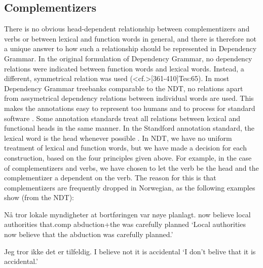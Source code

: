 \documentclass[11pt,a4paper]{article}
\begin{document}
\subsection{Complementizers}
There is no obvious head-dependent relationship between complementizers and verbs or between lexical and function words in general, and there is therefore not a unique answer to how such a relationship should be represented in Dependency Grammar.
In the original formulation of Dependency Grammar, no dependency relations were indicated between function words and lexical words. Instead, a different, symmetrical relation was used (\citeNP<cf.>[361-410]{Tes:65}). 
In most Dependency Grammar treebanks comparable to the NDT, no relations apart from assymetrical dependency relations between individual words are used.
This makes the annotations easy to represent too humans and to process for standard software \cite[4]{Mar:Man:08}.
Some annotation standards treat all relations between lexical and functional heads in the same manner. In the Standford annotation standard, the lexical word is the head whenever possible \cite[2]{Mar:Man:08}.
In NDT, we have no uniform treatment of lexical and function words, but we have made a decision for each construction, based on the four principles given above. For example, in the case of complementizers and verbs, we have chosen to let the verb be the head and the complementizer a dependent on the verb. The reason for this is that
complementizers are frequently dropped in Norwegian, as the following examples show (from the NDT):

\begin{examples}
\item\label{ex:medat}
\gll Nå tror lokale myndigheter at bortføringen var nøye planlagt.
now believe local authorities that.comp abduction+the was carefully planned
\glt `Local authorities now believe that the abduction was carefully planned.'
\glend

\item\label{ex:utenat}
\gll Jeg tror ikke det er tilfeldig.
I believe not it is accidental
\glt `I don't belive that it is accidental.'
\glend
\end{examples}
\end{document}
